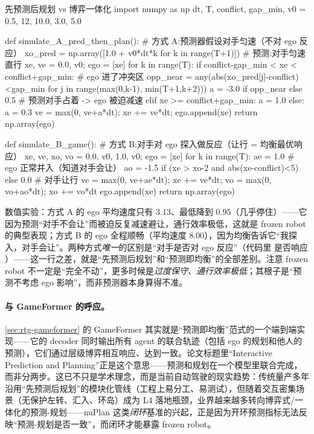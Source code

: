 \begin{codebox}[Python]{先预测后规划 vs 博弈一体化}
import numpy as np
dt, T, conflict, gap_min, v0 = 0.5, 12, 10.0, 3.0, 5.0

def simulate_A_pred_then_plan():               # 方式 A:预测器假设对手匀速（不对 ego 反应）
    xo_pred = np.array([1.0 + v0*dt*k for k in range(T+1)])   # 预测:对手匀速直行
    xe, ve = 0.0, v0; ego = [xe]
    for k in range(T):
        if conflict-gap_min < xe < conflict+gap_min:          # ego 进了冲突区
            opp_near = any(abs(xo_pred[j]-conflict)<gap_min for j in range(max(0,k-1), min(T+1,k+2)))
            a = -3.0 if opp_near else 0.5                      # 预测对手占着 -> ego 被迫减速
        elif xe >= conflict+gap_min: a = 1.0
        else: a = 0.3
        ve = max(0, ve+a*dt); xe += ve*dt; ego.append(xe)
    return np.array(ego)

def simulate_B_game():                          # 方式 B:对手对 ego 探入做反应（让行 = 均衡最优响应）
    xe, ve, xo, vo = 0.0, v0, 1.0, v0; ego = [xe]
    for k in range(T):
        ae = 1.0                                              # ego 正常并入（知道对手会让）
        ao = -1.5 if (xe > xo-2 and abs(xe-conflict)<5) else 0.0   # 对手让行
        ve = max(0, ve+ae*dt); xe += ve*dt; vo = max(0, vo+ao*dt); xo += vo*dt
        ego.append(xe)
    return np.array(ego)
\end{codebox}

\noindent 数值实验：方式 A 的 ego 平均速度只有 $3.13$、最低降到 $0.95$（几乎停住）——它因为预测“对手不会让”而被迫反复减速避让，通行效率极低，这就是 frozen robot 的典型表现；方式 B 的 ego 全程顺畅（平均速度 $8.00$），因为均衡告诉它“我探入，对手会让”\cite{peters2021inferring}。两种方式\emph{唯一}的区别是“对手是否对 ego 反应”（代码里 \verb@ao@ 是否响应 \verb@xe@）——这一行之差，就是“先预测后规划”和“预测即均衡”的全部差别。注意 frozen robot 不一定是“完全不动”，更多时候是\emph{过度保守、通行效率极低}；其根子是“预测不考虑 ego 影响”，而非预测器本身算得不准。

\paragraph{与 GameFormer 的呼应。}
\cref{sec:rtg-gameformer} 的 GameFormer 其实就是“预测即均衡”范式的一个端到端实现——它的 decoder 同时输出所有 agent 的联合轨迹（包括 ego 的规划和他人的预测），它们通过层级博弈相互响应、达到一致。论文标题里“Interactive Prediction and Planning”正是这个意思——预测和规划在一个模型里联合完成，而非分两步。这已不只是学术理念，而是当前自动驾驶的现实趋势：传统量产多年沿用“先预测后规划”的模块化管线（工程上易分工、易测试），但随着交互密集场景（无保护左转、汇入、环岛）成为 L4 落地瓶颈，业界越来越多转向博弈式/一体化的预测-规划——nuPlan 这类\emph{闭环}基准的兴起，正是因为开环预测指标无法反映“预测-规划是否一致”，而闭环才能暴露 frozen robot。

